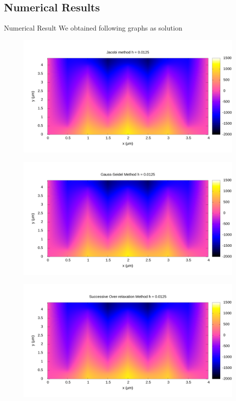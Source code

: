 \documentclass{beamer}
\begin{document}
				\subsection{Numerical Results}
				\begin{frame}[allowframebreaks]{Numerical Result}
					We obtained following graphs as solution 
					\begin{figure}
						\centering
						\includegraphics[width=\textwidth]{../report/content/graphs/Jacobi_0125_map.png}
					\end{figure}
					\begin{figure}
						\centering
						\includegraphics[width=\textwidth]{../report/content/graphs/gauss_map.png}
					\end{figure}
					\begin{figure}
						\centering
						\includegraphics[width=\textwidth]{../report/content/graphs/sor_map.png}
					\end{figure}

\end{frame}
\end{document}
